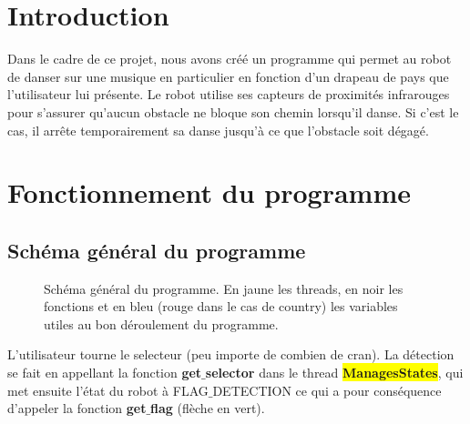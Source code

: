 \documentclass{article}
\begin{document}
    \newpage

    \setcounter{page}{1}

    \section{Introduction}

    Dans le cadre de ce projet, nous avons créé un programme qui permet au robot de danser sur une musique en particulier en fonction d'un drapeau de pays que l'utilisateur lui présente.
    Le robot utilise ses capteurs de proximités infrarouges pour s'assurer qu'aucun obstacle ne bloque son chemin lorsqu'il danse. 
    Si c'est le cas, il arrête temporairement sa danse jusqu'à ce que l'obstacle soit dégagé.

    \section{Fonctionnement du programme}
    
    \subsection{Schéma général du programme}
    \begin{figure}[!ht]
        \noindent{}
        \caption{Schéma général du programme. En jaune les threads, en noir les fonctions et en bleu (rouge dans le cas de country) les variables utiles au bon déroulement du programme.}
        \label{fig:structure} %
    \end{figure}

    L'utilisateur tourne le selecteur (peu importe de combien de cran). 
    La détection se fait en appellant la fonction \textbf{get$\_$selector} dans le thread \colorbox{yellow}{\textbf{ManagesStates}}, qui met ensuite l'état du robot à \textcolor{bleu}{FLAG$\_$DETECTION} ce qui a pour conséquence d'appeler la fonction \textbf{get$\_$flag} (\textcolor{vert}{flèche en vert}). \\ \par
    
\end{document}
